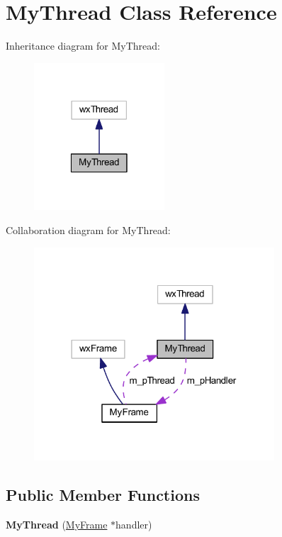 \hypertarget{class_my_thread}{\section{My\-Thread Class Reference}
\label{class_my_thread}
}


Inheritance diagram for My\-Thread\-:\nopagebreak
\begin{figure}[H]
\begin{center}
\leavevmode
\includegraphics[width=138pt]{class_my_thread__inherit__graph}
\end{center}
\end{figure}


Collaboration diagram for My\-Thread\-:\nopagebreak
\begin{figure}[H]
\begin{center}
\leavevmode
\includegraphics[width=254pt]{class_my_thread__coll__graph}
\end{center}
\end{figure}
\subsection*{Public Member Functions}
\begin{DoxyCompactItemize}
\item 
\hypertarget{class_my_thread_aa6e966c01502e58062e1fd5f6327cc58}{{\bfseries My\-Thread} (\hyperlink{class_my_frame}{My\-Frame} $\ast$handler)}\label{class_my_thread_aa6e966c01502e58062e1fd5f6327cc58}

\end{DoxyCompactItemize}
